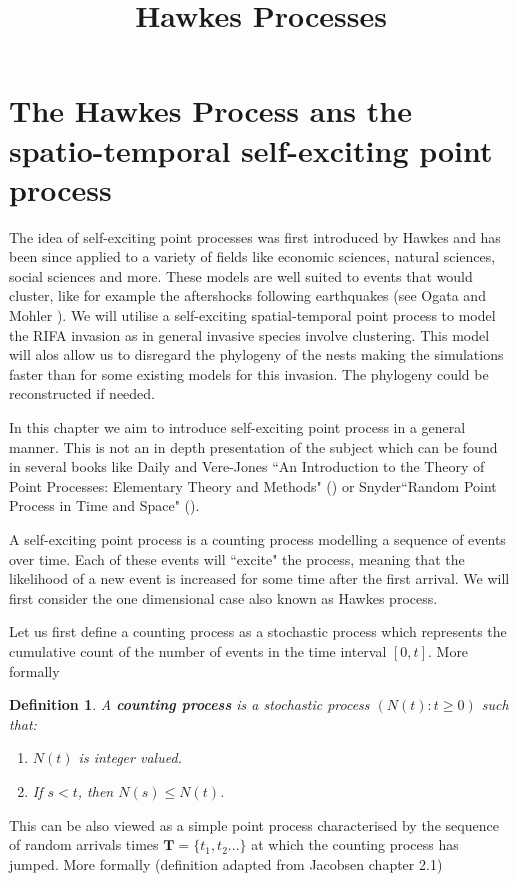 \documentclass[11pt,a4paper]{article}
\title{Hawkes Processes}
\renewcommand{\vec}[1]{\mathbf{#1}}
\newtheorem{definition}{Definition}[section]
\begin{document}
\section{The Hawkes Process ans the spatio-temporal self-exciting point process}

The idea of self-exciting point processes was first introduced by Hawkes \cite{Hawkes71} and has been since applied to a variety of fields like economic sciences, natural sciences, social sciences and more. These models are well suited to events that would cluster, like for example the aftershocks following earthquakes (see Ogata \cite{Ogata88} and Mohler \cite{Mohler}). We will utilise a self-exciting spatial-temporal point process to model the RIFA invasion as in general invasive species involve clustering. This model will alos allow us to disregard the phylogeny of the nests making the simulations faster than for some existing models for this invasion. The phylogeny could be reconstructed if needed.

In this chapter we aim to introduce self-exciting point process in a general manner. This is not an in depth presentation of the subject which can be found in several books like Daily and Vere-Jones ``An Introduction to the Theory of Point Processes: Elementary Theory and Methods" (\cite{Daley}) or Snyder``Random Point Process in Time and Space" (\cite{Snyder}).

A self-exciting point process is a counting process modelling a sequence of events over time. Each of these events will ``excite" the process, meaning that the likelihood of a new event is increased for some time after the first arrival. We will first consider the one dimensional case also known as Hawkes process.

Let us first define a counting process as a stochastic process which represents the cumulative count of the number of events in the time interval $[0, t]$. More formally

\begin{definition}
    A \textbf{counting process} is a stochastic process $(N(t) : t \geq 0)$ such that:
    \begin{enumerate}[label=(\roman*)]
        \item $N(t)$ is integer valued.
        \item If $s<t$, then $N(s) \leq N(t)$.
    \end{enumerate}
\end{definition}

This can be also viewed as a simple point process characterised by the sequence of random arrivals times $\vec{T} = \{ t_1, t_2 \dots \}$ at which the counting process has jumped. More formally (definition adapted from Jacobsen \cite{Jacobsen} chapter 2.1)
\end{document}
